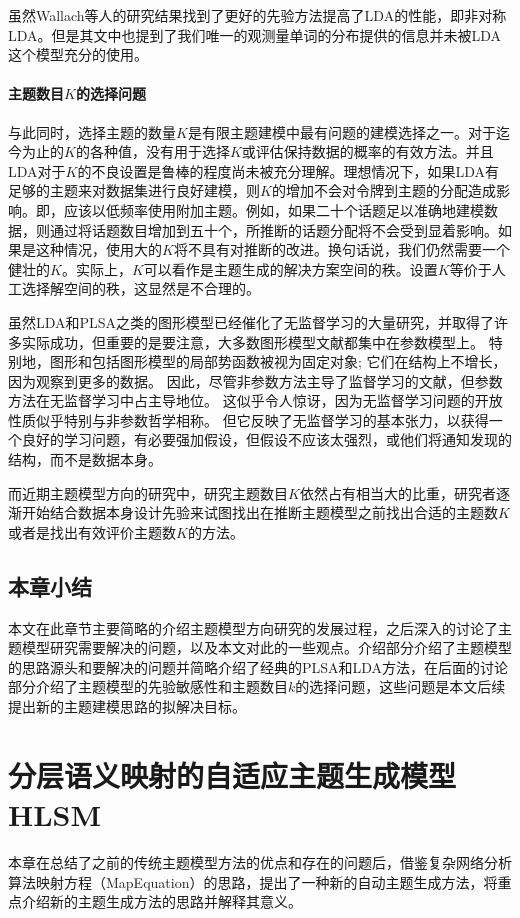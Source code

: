 虽然Wallach等人的研究结果找到了更好的先验方法提高了LDA的性能，即非对称LDA。但是其文中也提到了我们唯一的观测量单词的分布提供的信息并未被LDA这个模型充分的使用。
\subsubsection{主题数目$K$的选择问题}
与此同时，选择主题的数量$K$是有限主题建模中最有问题的建模选择之一。对于迄今为止的$K$的各种值，没有用于选择$K$或评估保持数据的概率的有效方法。并且LDA对于$K$的不良设置是鲁棒的程度尚未被充分理解\cite{RethinkingLDA}。理想情况下，如果LDA有足够的主题来对数据集进行良好建模，则$K$的增加不会对令牌到主题的分配造成影响。即，应该以低频率使用附加主题。例如，如果二十个话题足以准确地建模数据，则通过将话题数目增加到五十个，所推断的话题分配将不会受到显着影响。如果是这种情况，使用大的$K$将不具有对推断的改进。换句话说，我们仍然需要一个健壮的$K$。实际上，$K$可以看作是主题生成的解决方案空间的秩。设置$K$等价于人工选择解空间的秩，这显然是不合理的。

虽然LDA和PLSA之类的图形模型已经催化了无监督学习的大量研究，并取得了许多实际成功，但重要的是要注意，大多数图形模型文献都集中在参数模型上。 特别地，图形和包括图形模型的局部势函数被视为固定对象; 它们在结构上不增长，因为观察到更多的数据。 因此，尽管非参数方法主导了监督学习的文献，但参数方法在无监督学习中占主导地位。 这似乎令人惊讶，因为无监督学习问题的开放性质似乎特别与非参数哲学相称。 但它反映了无监督学习的基本张力，以获得一个良好的学习问题，有必要强加假设，但假设不应该太强烈，或他们将通知发现的结构，而不是数据本身。

而近期主题模型方向的研究中，研究主题数目$K$依然占有相当大的比重，研究者逐渐开始结合数据本身设计先验来试图找出在推断主题模型之前找出合适的主题数$K$或者是找出有效评价主题数$K$的方法。
\section{本章小结}
本文在此章节主要简略的介绍主题模型方向研究的发展过程，之后深入的讨论了主题模型研究需要解决的问题，以及本文对此的一些观点。介绍部分介绍了主题模型的思路源头和要解决的问题并简略介绍了经典的PLSA和LDA方法，在后面的讨论部分介绍了主题模型的先验敏感性和主题数目$k$的选择问题，这些问题是本文后续提出新的主题建模思路的拟解决目标。

\chapter{分层语义映射的自适应主题生成模型HLSM}
本章在总结了之前的传统主题模型方法的优点和存在的问题后，借鉴复杂网络分析算法映射方程（MapEquation）\cite{MAPEQUATION}的思路，提出了一种新的自动主题生成方法，将重点介绍新的主题生成方法的思路并解释其意义。
